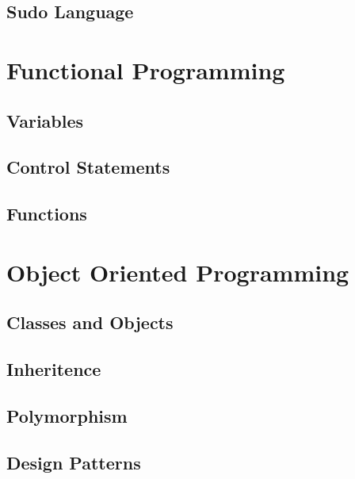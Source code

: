 \documentclass[10pt,a4paper,titlepage]{book}
\begin{document}
\section{Sudo Language}

\vfill
\pagebreak
\chapter{Functional Programming}

\vfill
\pagebreak
\section{Variables}

\vfill
\pagebreak
\section{Control Statements}

\vfill
\pagebreak
\section{Functions}

\vfill
\pagebreak
\chapter{Object Oriented Programming}

\vfill
\pagebreak
\section{Classes and Objects}

\vfill
\pagebreak
\section{Inheritence}

\vfill
\pagebreak
\section{Polymorphism}

\vfill
\pagebreak
\section{Design Patterns}

\vfill
\pagebreak
\end{document}
